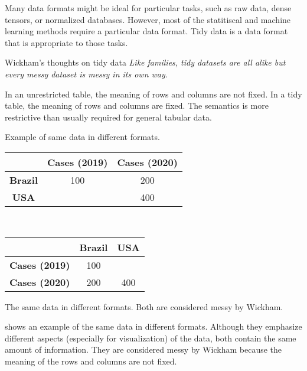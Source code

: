 Many data formats might be ideal for particular tasks, such as raw data, dense tensors, or
normalized databases.  However, most of the statitiscal and machine learning methods
require a particular data format.  Tidy data is a data format that is appropriate to those
tasks.

\begin{hlbox}{Wickham's thoughts on tidy data}
  \em
  Like families, tidy datasets are all alike but every messy dataset is messy in its own
  way.
\end{hlbox}

In an unrestricted table, the meaning of rows and columns are not fixed.  In a tidy table,
the meaning of rows and columns are fixed.  The semantics is more restrictive than usually
required for general tabular data.

\begin{tablebox}[label=tab:simple-messy]{Example of same data in different formats.}
  \centering
  \begin{tabular}{ccc}
    \toprule
     & \textbf{Cases (2019)} & \textbf{Cases (2020)} \\
    \midrule
    \textbf{Brazil} & 100 & 200 \\
    \textbf{USA} & & 400 \\
    \bottomrule
  \end{tabular}
  \\[1em]
  \begin{tabular}{ccc}
    \toprule
    & \textbf{Brazil} & \textbf{USA} \\
    \midrule
    \textbf{Cases (2019)} & 100 & \\
    \textbf{Cases (2020)} & 200 & 400 \\
    \bottomrule
  \end{tabular}
  \tcblower
  The same data in different formats.  Both are considered messy by Wickham.
\end{tablebox}

 shows an example of the same data in different formats.  Although
they emphasize different aspects (especially for visualization) of the data, both contain
the same amount of information.  They are considered messy by Wickham because the meaning
of the rows and columns are not fixed.


